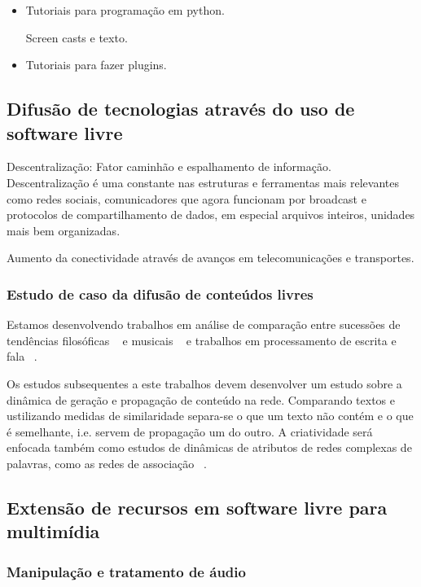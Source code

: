 \begin{itemize}
    \item Tutoriais para programação em python.

Screen casts e texto.

    \item Tutoriais para fazer plugins.
\end{itemize}

\subsection{Difusão de tecnologias através do uso de software livre}
\label{sec:uso_sl}

Descentralização: Fator caminhão e espalhamento de informação. Descentralização
é uma constante nas estruturas e ferramentas mais relevantes como redes
sociais, comunicadores que agora funcionam por broadcast e protocolos de
compartilhamento de dados, em especial arquivos inteiros, unidades mais
bem organizadas.

Aumento da conectividade através de avanços em telecomunicações e transportes.

\subsubsection{Estudo de caso da difusão de conteúdos livres}
\label{sec:dif_sl}

Estamos desenvolvendo trabalhos em análise de comparação
entre sucessões de tendências filosóficas ~\cite{philome} e
musicais ~\cite{musime} e trabalhos em processamento de escrita
e fala ~\cite{rede-associacoes, complenet, enfmc, ifsc}.

Os estudos subsequentes a este trabalhos devem desenvolver
um estudo sobre a dinâmica de geração e propagação de conteúdo na rede.
Comparando textos e ustilizando medidas de similaridade separa-se
o que um texto não contém e o que é semelhante, i.e. servem de propagação
um do outro. A criatividade será enfocada também como estudos de dinâmicas
de atributos de redes complexas de palavras, como as redes de associação ~\cite{rede-associacoes}.


\subsection{Extensão de recursos em software livre para multimídia}
\label{sec:extensao}

\subsubsection{Manipulação e tratamento de áudio}
\label{sec:manip-audio}


